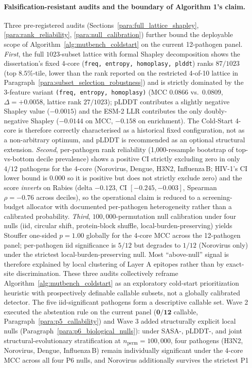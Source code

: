\paragraph{Falsification-resistant audits and the boundary of Algorithm 1's claim.}
\label{para:wave1_codex_audits}
Three pre-registered audits (Sections~\ref{para:full_lattice_shapley}, \ref{para:rank_reliability}, \ref{para:null_calibration}) further bound the deployable scope of Algorithm~\ref{alg:mutbench_coldstart} on the current 12-pathogen panel. \emph{First}, the full $1023$-subset lattice with formal Shapley decomposition shows the dissertation's fixed 4-core (\texttt{freq, entropy, homoplasy, plddt}) ranks $87/1023$ (top $8.5$\%-tile, lower than the rank reported on the restricted 4-of-10 lattice in Paragraph~\ref{para:subset_selection_robustness}) and is strictly dominated by the 3-feature variant \texttt{(freq, entropy, homoplasy)} (MCC $0.0866$ vs.\ $0.0809$, $\Delta = +0.0058$, lattice rank $27/1023$); pLDDT contributes a slightly negative Shapley value ($-0.0015$) and the ESM-2 LLR contributes the only doubly-negative Shapley ($-0.0144$ on MCC, $-0.158$ on enrichment). The Cold-Start 4-core is therefore correctly characterised as a historical fixed configuration, not as a non-arbitrary optimum, and pLDDT is recommended as an optional structural extension. \emph{Second}, per-pathogen rank reliability (1{,}000-resample bootstrap of top-vs-bottom decile prevalence) shows a positive CI strictly excluding zero in only $4/12$ pathogens for the 4-core (Norovirus, Dengue, H3N2, Influenza\,B; HIV-1's CI lower bound is $0.000$ so it is positive but does not strictly exclude zero) and the score \emph{inverts} on Rabies (delta $-0.123$, CI $[-0.245, -0.003]$, Spearman $\rho = -0.76$ across deciles), so the operational claim is reduced to a screening-budget allocator with documented per-pathogen heterogeneity rather than a calibrated probability. \emph{Third}, $100{,}000$-permutation null calibration under four nulls (iid, circular shift, protein-block shuffle, local-burden-preserving) yields Stouffer one-sided $p = 1.00$ globally for the 4-core MCC across the 12-pathogen panel; per-pathogen iid significance is $5/12$ but degrades to $1/12$ (Norovirus only) under the strictest local-burden-preserving null. Most ``above-null'' signal is therefore explained by local clustering of Layer A epitopes rather than by exact-site discrimination. These three audits collectively reframe Algorithm~\ref{alg:mutbench_coldstart} as an exploratory cold-start prioritization heuristic with prospectively definable callable subsets, not a globally calibrated detector. The five iid-significant pathogens form a descriptive callable set. Wave 2 executed the abstention rule on the current panel ($\mathbf{0/12}$ callable, Paragraph~\ref{para:p5_callability}) and Wave 3 added structurally explicit local nulls (Paragraph~\ref{para:p6_biological_nulls}): under SASA-, pLDDT-, and joint structural-evolutionary stratification at $n_{\text{perm}} = 100{,}000$, four pathogens (H3N2, Norovirus, Dengue, Influenza\,B) remain individually significant under the 4-core MCC across all four P6 nulls, and Norovirus additionally survives the strictest P1 
